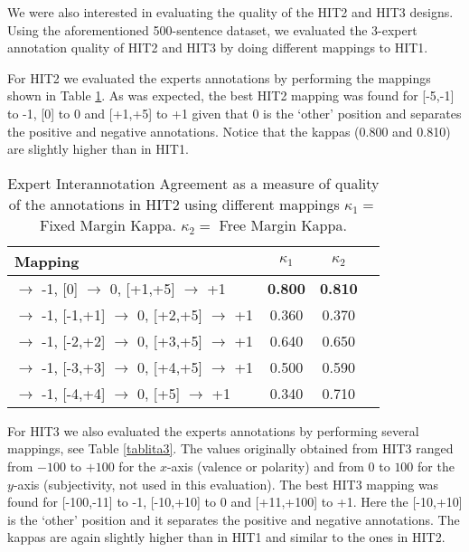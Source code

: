 \documentclass[11pt]{elsarticle}
\begin{document}

We were also interested in evaluating the quality of the
HIT2 and HIT3 designs. Using the aforementioned 500-sentence dataset, we evaluated the 3-expert annotation quality of HIT2 and HIT3 by doing different mappings to HIT1.

For HIT2 we evaluated the experts annotations by performing the mappings shown in Table \ref{tablita2}.
As was expected, the best HIT2 mapping was found for [-5,-1] to -1, [0] to 0 and [+1,+5] to +1 given that 0 is the `other' position and separates the positive and negative annotations. Notice that the kappas (0.800 and 0.810) are slightly higher than in HIT1.

\begin{table}[h]
\begin{center}
\begin{tabular}{|l|c|c|c|}
\hline
Mapping & $\kappa_{1}$ & $\kappa_{2}$ \\
\hline
[-5,-1] $\rightarrow$ -1, [0] $\rightarrow$ 0, [+1,+5] $\rightarrow$ +1& \textbf{0.800} & \textbf{0.810}\\ \hline
[-5,-2] $\rightarrow$ -1, [-1,+1] $\rightarrow$ 0, [+2,+5] $\rightarrow$ +1& 0.360 & 0.370\\ \hline
[-5,-3] $\rightarrow$ -1, [-2,+2] $\rightarrow$ 0, [+3,+5] $\rightarrow$ +1& 0.640 & 0.650\\ \hline
[-5,-4] $\rightarrow$ -1, [-3,+3] $\rightarrow$ 0, [+4,+5] $\rightarrow$ +1& 0.500 & 0.590\\ \hline
[-5] $\rightarrow$ -1, [-4,+4] $\rightarrow$ 0, [+5] $\rightarrow$ +1& 0.340 & 0.710\\ \hline
\end{tabular}
\end{center}
\caption{Expert Interannotation Agreement as a measure of quality of the annotations in HIT2 using different mappings $\kappa_{1} = $ Fixed Margin Kappa. $\kappa_{2} = $ Free Margin Kappa.}
\label{tablita2}
\end{table}

For HIT3 we also evaluated the experts annotations by performing several mappings, see Table \ref{tablita3}. The values originally obtained from HIT3 ranged from $-100$ to $+100$ for the $x$-axis (valence or polarity) and from $0$ to $100$ for the $y$-axis (subjectivity, not used in this evaluation).
The best HIT3 mapping was found for [-100,-11] to -1, [-10,+10] to 0 and [+11,+100] to +1. Here the [-10,+10] is the `other' position and it separates the positive and negative annotations. The kappas are again slightly higher than in HIT1 and similar to the ones in HIT2.
\end{document}
